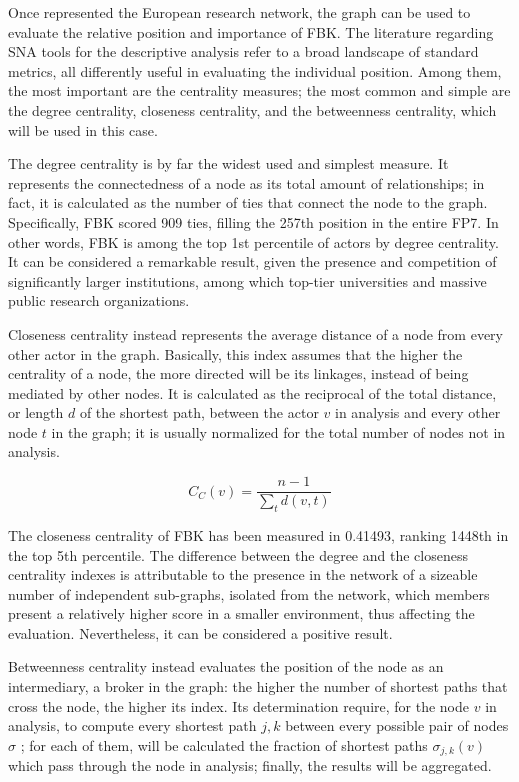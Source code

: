 Once represented the European research network, the graph can be used to evaluate the relative position and importance of FBK. The literature regarding SNA tools for the descriptive analysis refer to a broad landscape of standard metrics, all differently useful in evaluating the individual position. Among them, the most important are the centrality measures; the most common and simple are the degree centrality, closeness centrality, and the betweenness centrality, which will be used in this case.

The degree centrality is by far the widest used and simplest measure. It represents the connectedness of a node as its total amount of relationships; in fact, it is calculated as the number of ties that connect the node to the graph. Specifically, FBK scored 909 ties, filling the 257th position in the entire FP7. In other words, FBK is among the top 1st percentile of actors by degree centrality. It can be considered a remarkable result, given the presence and competition of significantly larger institutions, among which top-tier universities and massive public research organizations. 

Closeness centrality instead represents the average distance of a node from every other actor in the graph. Basically, this index assumes that the higher the centrality of a node, the more directed will be its linkages, instead of being mediated by other nodes. It is calculated as the reciprocal of the total distance, or length $d$ of the shortest path, between the actor $v$ in analysis and every other node $t$ in the graph; it is usually normalized for the total number of nodes not in analysis. 

\[
	C_C (v) =
		\frac 
			{n-1}
			{
				\sum_t d(v, t)
			} 
\]

The closeness centrality of FBK has been measured in 0.41493, ranking 1448th in the top 5th percentile. The difference between the degree and the closeness centrality indexes is attributable to the presence in the network of a sizeable number of independent sub-graphs, isolated from the network, which members present a relatively higher score in a smaller environment, thus affecting the evaluation. Nevertheless, it can be considered a positive result.  

Betweenness centrality instead evaluates the position of the node as an intermediary, a broker in the graph: the higher the number of shortest paths that cross the node, the higher its index. Its determination require, for the node $v$ in analysis, to compute every shortest path $j,k$ between every possible pair of nodes $\sigma$ ; for each of them, will be calculated the fraction of shortest paths $\sigma_{j,k} (v)$ which pass through the node in analysis; finally, the results will be aggregated. 

